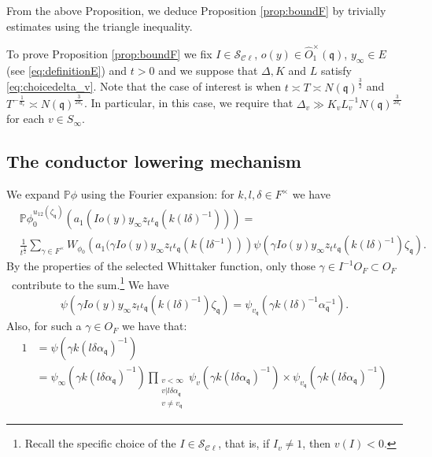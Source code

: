 \documentclass[a4paper,11pt]{amsart}
\theoremstyle{definition}
\newcommand{\cl}{\mathcal{C}\ell}
\begin{document}
From the above Proposition, we deduce Proposition \ref{prop:boundF} by trivially estimates using the triangle inequality.



To prove Proposition \ref{prop:boundF} we fix $I\in \mathcal{S}_{\cl}$, $o(y)\in \widehat{O}_1^{\times}(\mathfrak{q})$, $y_{\infty}\in E$ (see \eqref{eq:definitionE}) and $t>0$ and we suppose that $\Delta, K$ and $L$ satisfy \eqref{eq:choicedelta_v}. Note that the case of interest is when $t  \asymp T \asymp N(\mathfrak{q})^{\frac{3}{2}}$ and $T^{-\frac{1}{d_{v}}} \asymp N(\mathfrak{q})^{\frac{3}{2d_{v}}}$. In particular, in this case, we require that $\Delta_v\gg K_vL_v^{-1}N(\mathfrak{q})^{\frac{3}{2d_{v}}}$ for each $v\in S_{\infty}$. 


\subsection{The conductor lowering mechanism}
We expand $\mathbb{P}\phi$ using the Fourier expansion: for $k,l,\delta \in F^\times$ we have
\begin{align}\label{eq:10.1.1}
    &\mathbb{P}\phi_0^{u_{12}(\zeta_{\mathfrak{q}})}\left(a_1(Io(y)y_{\infty}z_t\iota_{\mathfrak{q}}(k(l\delta)^{-1}))\right) =     \nonumber\\    &\frac{1}{t^{\frac{1}{2}}}\sum_{\gamma \in F^{\times}}W_{\phi_0}\left(a_1(\gamma Io(y)y_{\infty}z_t\iota_{\mathfrak{q}}(k(l\delta^{-1}))\right)\psi(\gamma Io(y)y_{\infty}z_t\iota_\mathfrak{q}( k(l\delta)^{-1})\zeta_{\mathfrak{q}}).
\end{align}
By the properties of the selected Whittaker function, only those $\gamma \in I^{-1}O_F \subset O_F$\ contribute to the sum.\footnote{Recall the specific choice of the $I\in \mathcal{S}_{\cl}$, that is, if $I_v\neq 1$, then $v(I)<0$.}
We have
\begin{align*}\psi(\gamma Io(y)y_{\infty}z_t \iota_{\mathfrak{q}}(k(l\delta)^{-1})\zeta_{\mathfrak{q}})=
\psi_{v_{\mathfrak{q}}}(\gamma k(l\delta)^{-1}\alpha_{\mathfrak{q}}^{-1}).
\end{align*}
Also, for such a $\gamma \in O_F$ we have that:
\begin{align*}
    1 &= \psi(\gamma k(l\delta\alpha_{\mathfrak{q}})^{-1}) \\&= \psi_{\infty}(\gamma k(l\delta\alpha_{\mathfrak{q}})^{-1})\prod_{\substack{v<\infty\\v|l\delta \alpha_{\mathfrak{q}}\\v\neq v_{\mathfrak{q}}}}\psi_v(\gamma k(l\delta\alpha_{\mathfrak{q}})^{-1}) \times \psi_{v_{\mathfrak{q}}}(\gamma k(l\delta\alpha_{\mathfrak{q}})^{-1})
\end{align*}
\end{document}
